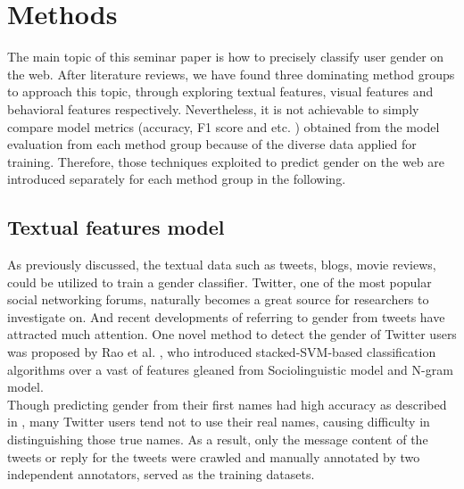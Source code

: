 \documentclass[runningheads]{llncs}
\begin{document}
	\section{Methods}
	
	The main topic of this seminar paper is how to precisely classify user gender on the web. After literature reviews, we have found three dominating method groups to approach this topic, through exploring textual features, visual features and behavioral features respectively. Nevertheless, it is not achievable to simply compare model metrics (accuracy, F1 score and etc. ) obtained from the model evaluation from each method group because of the diverse data applied for training. Therefore, those techniques exploited to predict gender on the web are introduced separately for each method group in the following. 
	
	\subsection{Textual features model}
	
	As previously discussed, the textual data such as tweets, blogs, movie reviews, could be utilized to train a gender classifier. Twitter, one of the most popular social networking forums, naturally becomes a great source for researchers to investigate on. And recent developments of referring to gender from tweets have attracted much attention. One novel method to detect the gender of Twitter users was proposed by Rao et al. \cite{rao2010classifying}, who introduced stacked-SVM-based classification algorithms over a vast of features gleaned from Sociolinguistic model and N-gram model.  \\
	
	Though predicting gender from their first names had high accuracy as described in \cite{karimi2016inferring}, many Twitter users tend not to use their real names, causing difficulty in distinguishing those true names. As a result, only the message content of the tweets or reply for the tweets were crawled and manually annotated by two independent annotators, served as the training datasets.  \\
	
\end{document}
